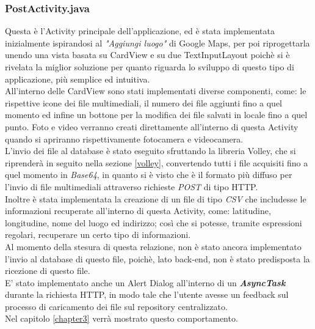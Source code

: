 \subsubsection{PostActivity.java}
Questa è l'Activity principale dell'applicazione, ed è stata implementata inizialmente ispirandosi al \textit{"Aggiungi luogo"} di Google Maps, per poi riprogettarla unendo una vista basata su CardView e su due TextInputLayout poichè si è rivelata la miglior soluzione per quanto riguarda lo sviluppo di questo tipo di applicazione, più semplice ed intuitiva.
\\All'interno delle CardView sono stati implementati diverse componenti, come: le rispettive icone dei file multimediali, il numero dei file aggiunti fino a quel momento ed infine un bottone per la modifica dei file salvati in locale fino a quel punto. Foto e video verranno creati direttamente all'interno di questa Activity quando si apriranno rispettivamente fotocamera e videocamera.
\\L'invio dei file al database è stato eseguito sfruttando la libreria Volley, che si riprenderà in seguito nella sezione \ref{volley}, convertendo tutti i file acquisiti fino a quel momento in \textit{Base64}, in quanto si è visto che è il formato più diffuso per l'invio di file multimediali attraverso richieste \textit{POST} di tipo HTTP. 
\\Inoltre è stata implementata la creazione di un file di tipo \textit{CSV} che includesse le informazioni recuperate all'interno di questa Activity, come: latitudine, longitudine, nome del luogo ed indirizzo; così che si potesse, tramite espressioni regolari, recuperare un certo tipo di informazioni.
\\Al momento della stesura di questa relazione, non è stato ancora implementato l'invio al database di questo file, poichè, lato back-end, non è stato predisposta la ricezione di questo file.
\\E' stato implementato anche un Alert Dialog all'interno di un \textit{\textbf{AsyncTask}} durante la richiesta HTTP, in modo tale che l'utente avesse un feedback sul processo di caricamento dei file sul repository centralizzato.
\\Nel capitolo \ref{chapter3} verrà mostrato questo comportamento.
